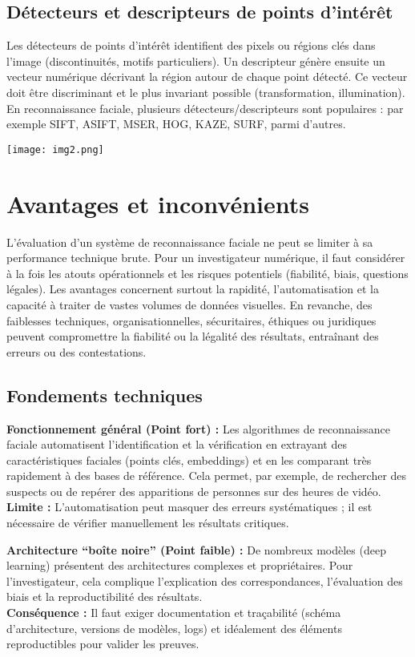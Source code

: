 \documentclass[11pt,a4paper]{article}
\begin{document}
	\subsection{Détecteurs et descripteurs de points d’intérêt}
	Les détecteurs de points d’intérêt identifient des pixels ou régions clés dans l’image (discontinuités, motifs particuliers). Un descripteur génère ensuite un vecteur numérique décrivant la région autour de chaque point détecté. Ce vecteur doit être discriminant et le plus invariant possible (transformation, illumination). En reconnaissance faciale, plusieurs détecteurs/descripteurs sont populaires : par exemple SIFT, ASIFT, MSER, HOG, KAZE, SURF, parmi d’autres.
	
	
	\texttt{[image: img2.png]}
	
	\section{ Avantages et inconvénients}
	\vspace{0.5cm}
	L’évaluation d’un système de reconnaissance faciale ne peut se limiter à sa performance technique brute. Pour un investigateur numérique, il faut considérer à la fois les atouts opérationnels et les risques potentiels (fiabilité, biais, questions légales). Les avantages concernent surtout la rapidité, l’automatisation et la capacité à traiter de vastes volumes de données visuelles. En revanche, des faiblesses techniques, organisationnelles, sécuritaires, éthiques ou juridiques peuvent compromettre la fiabilité ou la légalité des résultats, entraînant des erreurs ou des contestations.
	\vspace{0.5cm}
	\subsection{Fondements techniques}
	\textbf{Fonctionnement général (Point fort) :} Les algorithmes de reconnaissance faciale automatisent l’identification et la vérification en extrayant des caractéristiques faciales (points clés, embeddings) et en les comparant très rapidement à des bases de référence. Cela permet, par exemple, de rechercher des suspects ou de repérer des apparitions de personnes sur des heures de vidéo. \\
	\textbf{Limite :} L’automatisation peut masquer des erreurs systématiques ; il est nécessaire de vérifier manuellement les résultats critiques.
	
	\textbf{Architecture “boîte noire” (Point faible) :} De nombreux modèles (deep learning) présentent des architectures complexes et propriétaires. Pour l’investigateur, cela complique l’explication des correspondances, l’évaluation des biais et la reproductibilité des résultats. \\
	\textbf{Conséquence :} Il faut exiger documentation et traçabilité (schéma d’architecture, versions de modèles, logs) et idéalement des éléments reproductibles pour valider les preuves.
	
\end{document}
